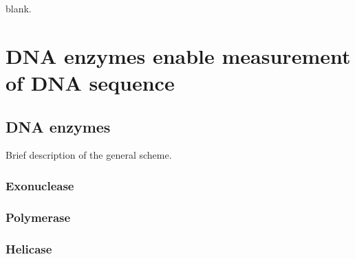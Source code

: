 \begin{savequote}[75mm]
blank.
\end{savequote}

\chapter{DNA enzymes enable measurement of DNA sequence}
\label{dna_enzymes}

\section{DNA enzymes}

Brief description of the general scheme.

\subsection{Exonuclease}

\subsection{Polymerase}

\subsection{Helicase}